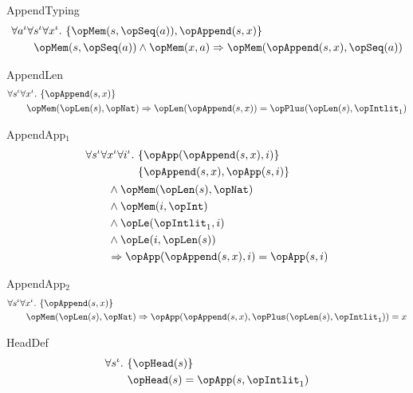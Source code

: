 \documentclass[11pt, a4paper, oneside]{article}
\begin{document}
\begin{axioms}
\item[AppendTyping] \[
        \begin{aligned}
            &\forall a^\idv \forall s^\idv \forall x^\idv.\, \st{ \opMem(s, \opSeq(a)), \opAppend(s, x) } \\
            &\qquad \opMem(s, \opSeq(a)) \wedge \opMem(x, a) \imp \opMem(\opAppend(s, x), \opSeq(a))
        \end{aligned}
    \]

\item[AppendLen] \[
        \begin{aligned}
            &\forall s^\idv \forall x^\idv.\, \st{ \opAppend(s, x) } \\
            &\qquad \opMem(\opLen(s), \opNat) \imp \opLen(\opAppend(s, x)) = \opPlus(\opLen(s), \opIntlit_1)
        \end{aligned}
    \]

\item[AppendApp$_1$] \[
        \begin{aligned}
            &\forall s^\idv \forall x^\idv \forall i^\idv.\, \begin{aligned}[t]
                &\st{ \opApp(\opAppend(s, x), i) } \\
                &\st{ \opAppend(s, x), \opApp(s, i) }
            \end{aligned} \\
            &\qquad \wedge \opMem(\opLen(s), \opNat) \\
            &\qquad \wedge \opMem(i, \opInt) \\
            &\qquad \wedge \opLe(\opIntlit_1, i) \\
            &\qquad \wedge \opLe(i, \opLen(s)) \\
            &\qquad \imp \opApp(\opAppend(s, x), i) = \opApp(s, i)
        \end{aligned}
    \]

\item[AppendApp$_2$] \[
        \begin{aligned}
            &\forall s^\idv \forall x^\idv.\, \st{ \opAppend(s, x) } \\
            &\qquad \opMem(\opLen(s), \opNat) \imp \opApp(\opAppend(s, x), \opPlus(\opLen(s), \opIntlit_1)) = x
        \end{aligned}
    \]

\item[HeadDef] \[
        \begin{aligned}
            &\forall s^\idv.\, \st{ \opHead(s) } \\
            &\qquad \opHead(s) = \opApp(s, \opIntlit_1)
        \end{aligned}
    \]


\end{axioms}
\end{document}
